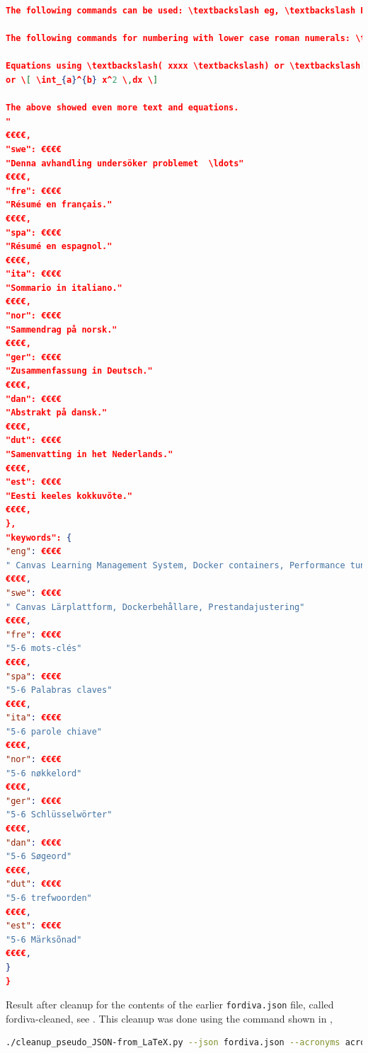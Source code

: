 \begin{lstlisting}[language={json}, caption={Resulting fordiva.json file}, label=lst:resultingForDIVAfile]
The following commands can be used: \textbackslash eg, \textbackslash Eg, \textbackslash ie, \textbackslash Ie, \textbackslash etc, and \textbackslash etal: \eg, \Eg, \ie, \Ie, \etc, and \etal

The following commands for numbering with lower case roman numerals: \textbackslash first, \textbackslash Second, \textbackslash third, \textbackslash fourth, \textbackslash fifth, \textbackslash sixth, \textbackslash seventh, and \textbackslash eighth: \first, \Second, \third, \fourth, \fifth, \sixth, \seventh, and \eighth.

Equations using \textbackslash( xxxx \textbackslash) or \textbackslash[ xxxx \textbackslash] can be used in the abstract. For example: \( (C_5O_2H_8)_n \)
or \[ \int_{a}^{b} x^2 \,dx \]

The above showed even more text and equations.
"
€€€€,
"swe": €€€€
"Denna avhandling undersöker problemet  \ldots"
€€€€,
"fre": €€€€
"Résumé en français."
€€€€,
"spa": €€€€
"Résumé en espagnol."
€€€€,
"ita": €€€€
"Sommario in italiano."
€€€€,
"nor": €€€€
"Sammendrag på norsk."
€€€€,
"ger": €€€€
"Zusammenfassung in Deutsch."
€€€€,
"dan": €€€€
"Abstrakt på dansk."
€€€€,
"dut": €€€€
"Samenvatting in het Nederlands."
€€€€,
"est": €€€€
"Eesti keeles kokkuvõte."
€€€€,
},
"keywords": {
"eng": €€€€
" Canvas Learning Management System, Docker containers, Performance tuning"
€€€€,
"swe": €€€€
" Canvas Lärplattform, Dockerbehållare, Prestandajustering"
€€€€,
"fre": €€€€
"5-6 mots-clés"
€€€€,
"spa": €€€€
"5-6 Palabras claves"
€€€€,
"ita": €€€€
"5-6 parole chiave"
€€€€,
"nor": €€€€
"5-6 nøkkelord"
€€€€,
"ger": €€€€
"5-6 Schlüsselwörter"
€€€€,
"dan": €€€€
"5-6 Søgeord"
€€€€,
"dut": €€€€
"5-6 trefwoorden"
€€€€,
"est": €€€€
"5-6 Märksõnad"
€€€€,
}
}
\end{lstlisting}
Result after cleanup for the contents of the earlier \texttt{fordiva.json} file, called fordiva-cleaned, see . This cleanup was done using the command shown in ,

\begin{lstlisting}[language={bash}, caption={Command to clean up the fordiva.json file}, label=lst:cleanupJSON]
./cleanup_pseudo_JSON-from_LaTeX.py --json fordiva.json --acronyms acronyms.tex
\end{lstlisting}

